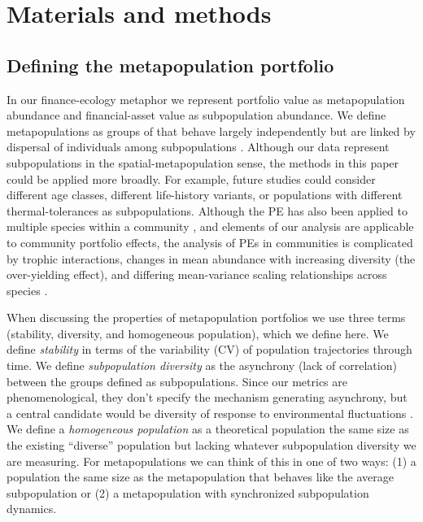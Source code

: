 \section{Materials and methods}

\subsection{Defining the metapopulation portfolio}

In our finance-ecology metaphor we represent portfolio value as
metapopulation abundance and financial-asset value as subpopulation abundance.
We define metapopulations as groups of  that behave largely
independently but are linked by dispersal of individuals among subpopulations
\citep{levins1969}.
Although our data represent subpopulations in the spatial-metapopulation
sense, the methods in this paper could be applied more broadly.
For example, future studies could consider different age classes, different
life-history variants, or populations with different thermal-tolerances as
subpopulations.
Although the PE has also been applied to multiple species within a
community \citep[e.g.][]{doak1998, tilman1998, karp2011}, and
elements of our analysis are applicable to community portfolio effects, the
analysis of PEs in communities is complicated by trophic interactions, changes
in mean abundance with increasing diversity (the over-yielding effect), and
differing mean-variance scaling relationships across species
\citep[e.g.][]{loreau2010, thibaut2013}.

When discussing the properties of metapopulation portfolios we use
three terms (stability, diversity, and homogeneous population), which we define
here.
We define \textit{stability} in terms of the variability (CV) of population
trajectories through time.
We define \textit{subpopulation diversity} as the asynchrony (lack of
correlation) between the groups defined as subpopulations.
Since our metrics are phenomenological, they don't specify the mechanism
generating asynchrony, but a central candidate would be diversity of response
to environmental fluctuations
\citep[e.g.][]{elmqvist2003,loreau2008,thibaut2012}.
We define a \textit{homogeneous population} as a theoretical population the
same size as the existing ``diverse'' population but lacking whatever
subpopulation diversity we are measuring. For metapopulations we can think of
this in one of two ways: (1) a population the same size as the metapopulation
that behaves like the average subpopulation or (2) a metapopulation with synchronized
subpopulation dynamics.

